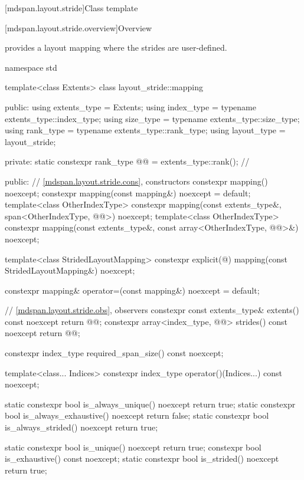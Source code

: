 [mdspan.layout.stride]{Class template }

[mdspan.layout.stride.overview]{Overview}

\pnum
{} provides a layout mapping
where the strides are user-defined.

\begin{codeblock}
namespace std {
  template<class Extents>
  class layout_stride::mapping {
  public:
    using extents_type = Extents;
    using index_type = typename extents_type::index_type;
    using size_type = typename extents_type::size_type;
    using rank_type = typename extents_type::rank_type;
    using layout_type = layout_stride;

  private:
    static constexpr rank_type @@ = extents_type::rank();    // \expos

  public:
    // \ref{mdspan.layout.stride.cons}, constructors
    constexpr mapping() noexcept;
    constexpr mapping(const mapping&) noexcept = default;
    template<class OtherIndexType>
      constexpr mapping(const extents_type&, span<OtherIndexType, @@>) noexcept;
    template<class OtherIndexType>
      constexpr mapping(const extents_type&, const array<OtherIndexType, @@>&) noexcept;

    template<class StridedLayoutMapping>
      constexpr explicit(@\seebelow@) mapping(const StridedLayoutMapping&) noexcept;

    constexpr mapping& operator=(const mapping&) noexcept = default;

    // \ref{mdspan.layout.stride.obs}, observers
    constexpr const extents_type& extents() const noexcept { return @@; }
    constexpr array<index_type, @@> strides() const noexcept { return @@; }

    constexpr index_type required_span_size() const noexcept;

    template<class... Indices>
      constexpr index_type operator()(Indices...) const noexcept;

    static constexpr bool is_always_unique() noexcept { return true; }
    static constexpr bool is_always_exhaustive() noexcept { return false; }
    static constexpr bool is_always_strided() noexcept { return true; }

    static constexpr bool is_unique() noexcept { return true; }
    constexpr bool is_exhaustive() const noexcept;
    static constexpr bool is_strided() noexcept { return true; }

}}
\end{codeblock}
